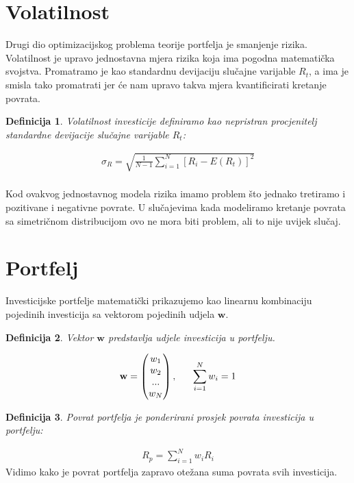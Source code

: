 \documentclass[zavrsnirad]{fer}
\newtheorem{definition}{Definicija}
\begin{document}
\section{Volatilnost}
Drugi dio optimizacijskog problema teorije portfelja je smanjenje rizika.
Volatilnost je upravo jednostavna mjera rizika koja ima pogodna matematička svojstva.
Promatramo je kao standardnu devijaciju slučajne varijable $R_t$, a ima je smisla tako promatrati
jer će nam upravo takva mjera kvantificirati kretanje povrata.
\begin{definition}
	Volatilnost investicije definiramo kao nepristran procjenitelj
	standardne devijacije slučajne varijable $R_t$:
\end{definition}
\begin{align*}
	\sigma_R = \sqrt{\frac{1}{N - 1} \sum_{i = 1}^{N} \left[R_i - E(R_t)\right]^2}
\end{align*}
\\
Kod ovakvog jednostavnog modela rizika imamo problem što jednako tretiramo i pozitivane i negativne povrate.
U slučajevima kada modeliramo kretanje povrata sa simetričnom distribucijom ovo
ne mora biti problem, ali to nije uvijek slučaj.

\section{Portfelj}
Investicijske portfelje matematički prikazujemo kao linearnu kombinaciju
pojedinih investicija sa vektorom pojedinih udjela $\mathbf{w}$.
\begin{definition}
	Vektor $\mathbf{w}$ predstavlja udjele investicija u portfelju.
\end{definition}
\begin{align*}
	\mathbf{w} = \begin{pmatrix} w_1 \\ w_2 \\ ... \\ w_N \end{pmatrix},
	\indent \sum_{i = 1}^{N} w_i = 1
\end{align*}

\begin{definition}
	Povrat portfelja je ponderirani prosjek povrata investicija u portfelju:
\end{definition}
\begin{align*}
	R_p = \sum_{i = 1}^{N} w_i R_i
\end{align*}
\indent Vidimo kako je povrat portfelja zapravo otežana suma povrata svih investicija.
\end{document}
